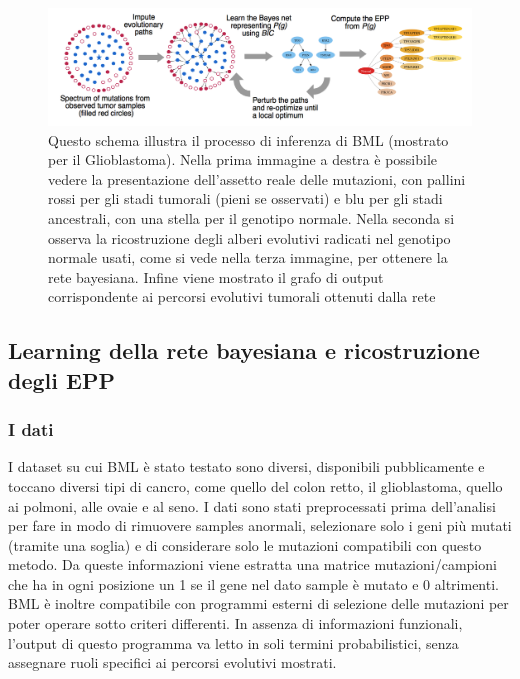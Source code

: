 \documentclass[a4paper]{article}
\begin{document}
	\begin{figure}[h]
	  \centering
	  \includegraphics[scale=0.13, keepaspectratio]{SchemaBML.png}%
	  \captionsetup{justification=centering,margin=0.5cm}
	  \caption{Questo schema illustra il processo di inferenza di BML (mostrato per il Glioblastoma). Nella prima immagine a destra è possibile
	  vedere la presentazione dell'assetto reale delle mutazioni, con pallini rossi per gli stadi tumorali (pieni se osservati) e blu per 
	  gli stadi ancestrali, con una stella per il genotipo normale. Nella seconda si osserva la ricostruzione degli alberi evolutivi radicati nel
	  genotipo normale usati, come si vede nella terza immagine, per ottenere la rete bayesiana.
	  Infine viene mostrato il grafo di output corrispondente ai percorsi evolutivi tumorali ottenuti dalla rete} \label{fig:SchemaBML}
	\end{figure}

	\subsection{\large Learning della rete bayesiana e ricostruzione degli EPP}

	\subsubsection{I dati}

	I dataset su cui BML è stato testato sono diversi, disponibili pubblicamente e toccano diversi tipi di cancro, come quello del colon retto,
	il glioblastoma, quello ai polmoni, alle ovaie e al seno. I dati sono stati preprocessati prima dell'analisi 
	per fare in modo di rimuovere samples anormali, selezionare solo i geni più mutati (tramite una soglia) e di considerare solo le mutazioni compatibili con questo metodo.
	Da queste informazioni viene estratta una matrice mutazioni/campioni che ha in ogni posizione un 1 se il gene nel dato sample è mutato e 0 altrimenti. 
	BML è inoltre compatibile con programmi esterni di selezione delle mutazioni per poter operare sotto criteri differenti.
	In assenza di informazioni funzionali, l'output di questo programma va letto in soli termini probabilistici, senza assegnare ruoli specifici ai percorsi evolutivi mostrati.
\end{document}
